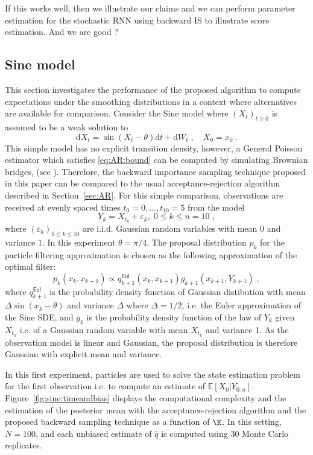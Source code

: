 \documentclass{article}
\def\pE{\mathbb{E}}
\newcommand{\rmd}{\ensuremath{\mathrm{d}}}
\newcommand{\eqsp}{\;}
\begin{document}
If this works well, then we illustrate our claims and we can perform parameter estimation for the stochastic RNN using backward IS to illustrate score estimation. And we are good ?

\subsection{Sine model}
\label{sec:simu:SINE}
This section investigates the performance of the proposed algorithm to compute  expectations under the smoothing distributions in a context where  alternatives are available for comparison. Consider the Sine model where $(X_t)_{t\geqslant 0}$ is assumed to be a weak solution to
$$
\rmd X_t = \sin(X_t-\theta)\rmd t + \rmd W_t\eqsp,\quad X_0 = x_0\eqsp.
$$
This simple model has no explicit transition density, however, a General Poisson estimator which satisfies \eqref{eq:AR:bound} can be computed by simulating Brownian bridges, (see \cite{beskos2006exact}). 
Therefore, the backward importance sampling technique proposed in this paper can be compared to the usual acceptance-rejection algorithm described in Section~\ref{sec:AR}. 
For this simple comparison, observations are received at evenly spaced times $t_0=0,\ldots, t_{10} = 5$ from the model
\begin{equation}
\label{eq:obs:model:SINE}
Y_k=X_{t_k}+\varepsilon_k,\eqsp 0\leqslant k \leqslant n = 10\eqsp,
\end{equation}
where $(\varepsilon_k)_{0 \leqslant k\leqslant 10}$ are i.i.d. Gaussian random variables with mean $0$ and variance $1$. In this experiment $\theta = \pi/4$. 
The proposal distribution $p_k$ for the particle filtering approximation is chosen as the following approximation of the optimal filter:
\begin{equation}
\label{eq:optimal:filter}
p_{k}(x_{k},x_{k+1})\!\propto\! q^{\mathsf{Eul}}_{k+1}(x_{k},x_{k+1})g_{k+1}(x_{k+1},Y_{k+1})\eqsp,
\end{equation}
where $q^{\mathsf{Eul}}_{k+1}$ is the probability density function of Gaussian distibution with mean $\Delta \sin(x_k-\theta)$ and variance $\Delta$ where $\Delta = 1/2$, i.e. the Euler approximation of the Sine SDE, and $g_k$ is the probability density function of the law of $Y_k$ given $X_{t_k}$ i.e. of a Gaussian random variable with mean $X_{t_k}$ and variance 1. 
As the observation model is linear and Gaussian, the proposal distribution is therefore Gaussian with explicit mean and variance. 

In this first experiment, particles are used to solve the state estimation problem for the first observation i.e. to compute an estimate of $ \pE[ X_{0} | Y_{0:n}]$.
Figure~\ref{fig:sine:timeandbias} displays the computational complexity and the estimation of the posterior mean with the acceptance-rejection algorithm and the proposed backward sampling technique as a function of $\K$. 
In this setting, $N=100$, and each unbiased estimate of $\hat{q}$ is computed using 30 Monte Carlo replicates.
\end{document}

